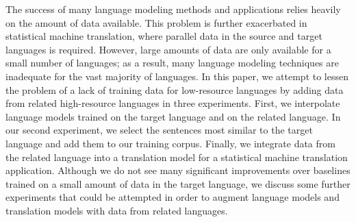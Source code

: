 The success of many language modeling methods and applications relies heavily on the amount of data available. This problem is further exacerbated in statistical machine translation, where parallel data in the source and target languages is required. However, large amounts of data are only available for a small number of languages; as a result, many language modeling techniques are inadequate for the vast majority of languages. In this paper, we attempt to lessen the problem of a lack of training data for low-resource languages by adding data from related high-resource languages in three experiments. First, we interpolate language models trained on the target language and on the related language. In our second experiment, we select the sentences most similar to the target language and add them to our training corpus. Finally, we integrate data from the related language into a translation model for a statistical machine translation application. Although we do not see many significant improvements over baselines trained on a small amount of data in the target language, we discuss some further experiments that could be attempted in order to augment language models and translation models with data from related languages.
